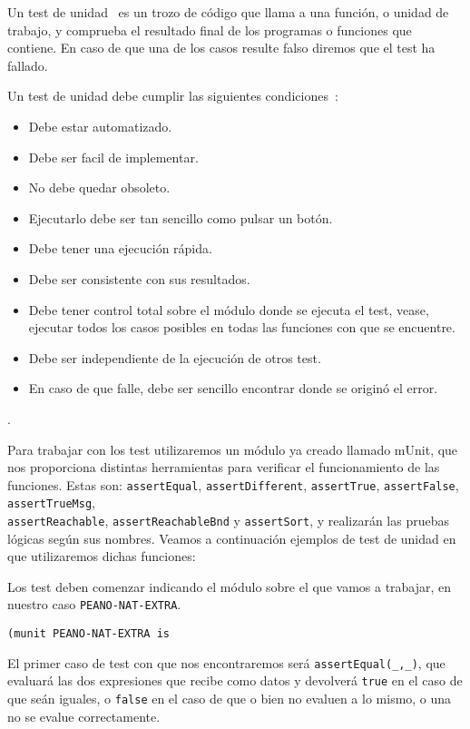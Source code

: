 Un test de unidad~\cite{unitTests} es un trozo de código que llama a una función, o unidad de trabajo, y comprueba el resultado final de los programas o funciones que contiene. En caso de que una de los casos resulte falso diremos que el test ha fallado.\par

Un test de unidad debe cumplir las siguientes condiciones~\cite{unitTests}: \par

\begin{itemize}
\item Debe estar automatizado.
\item Debe ser facil de implementar.
\item No debe quedar obsoleto.
\item Ejecutarlo debe ser tan sencillo como pulsar un botón.
\item Debe tener una ejecución rápida.
\item Debe ser consistente con sus resultados. 
\item Debe tener control total sobre el módulo donde se ejecuta el test, vease, ejecutar todos los casos posibles en todas las funciones con que se encuentre.
\item Debe ser independiente de la ejecución de otros test.
\item En caso de que falle, debe ser sencillo encontrar donde se originó el error.
\end{itemize}.

Para trabajar con los test utilizaremos un módulo ya creado llamado mUnit, que nos proporciona distintas herramientas para verificar el funcionamiento de las funciones. Estas son: \verb"assertEqual", \verb"assertDifferent", \verb"assertTrue", \verb"assertFalse", \verb"assertTrueMsg",\\ \verb"assertReachable", \verb"assertReachableBnd" y \verb"assertSort", y realizarán las pruebas lógicas según sus nombres. Veamos a continuación ejemplos de test de unidad en que utilizaremos dichas funciones:\par

Los test deben comenzar indicando el módulo sobre el que vamos a trabajar, en nuestro caso \texttt{PEANO-NAT-EXTRA}. \par

{\codesize
\begin{verbatim}
(munit PEANO-NAT-EXTRA is
\end{verbatim}
}

El primer caso de test con que nos encontraremos será \verb"assertEqual(_,_)", que evaluará las dos expresiones que recibe como datos y devolverá \texttt{true} en el caso de que seán iguales, o \texttt{false} en el caso de que o bien no evaluen a lo mismo, o una no se evalue correctamente. \par

